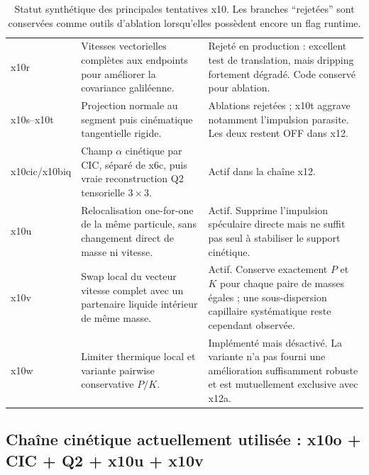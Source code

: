 \documentclass[11pt,a4paper]{article}
\begin{document}
\begin{table}[htbp]
\begin{tabular}{>{\raggedright\arraybackslash}p{2.0cm}
                >{\raggedright\arraybackslash}p{7.2cm}
                >{\raggedright\arraybackslash}p{5.0cm}}
x10r &
Vitesses vectorielles complètes aux endpoints pour améliorer la covariance galiléenne. &
Rejeté en production : excellent test de translation, mais dripping fortement dégradé. Code conservé pour ablation. \\
x10s--x10t &
Projection normale au segment puis cinématique tangentielle rigide. &
Ablations rejetées ; x10t aggrave notamment l'impulsion parasite. Les deux restent OFF dans x12. \\
x10cic/x10biq &
Champ $\alpha$ cinétique par CIC, séparé de x6c, puis vraie reconstruction Q2 tensorielle $3\times3$. &
Actif dans la chaîne x12. \\
x10u &
Relocalisation one-for-one de la même particule, sans changement direct de masse ni vitesse. &
Actif. Supprime l'impulsion spéculaire directe mais ne suffit pas seul à stabiliser le support cinétique. \\
x10v &
Swap local du vecteur vitesse complet avec un partenaire liquide intérieur de même masse. &
Actif. Conserve exactement $P$ et $K$ pour chaque paire de masses égales ; une sous-dispersion capillaire systématique reste cependant observée. \\
x10w &
Limiter thermique local et variante pairwise conservative $P/K$. &
Implémenté mais désactivé. La variante n'a pas fourni une amélioration suffisamment robuste et est mutuellement exclusive avec x12a. \\
\bottomrule
\end{tabular}
\caption{Statut synthétique des principales tentatives x10. Les branches ``rejetées'' sont conservées comme outils d'ablation lorsqu'elles possèdent encore un flag runtime.}
\label{tab:x10_attempts_status}
\end{table}

\subsection{Chaîne cinétique actuellement utilisée : x10o + CIC + Q2 + x10u + x10v}
\end{document}

